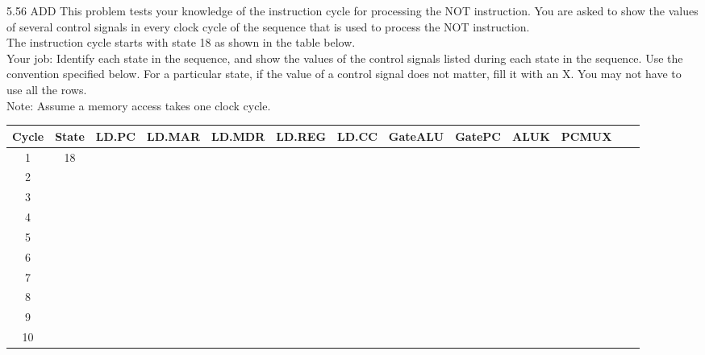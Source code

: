 \documentclass{patt}
\begin{document}
\begin{exercises}
\item[5.56]ADD This problem tests your knowledge of the instruction cycle for processing
the NOT instruction.  You are asked to show the values of several control
signals in every clock cycle of the sequence that is used to process the
NOT instruction.\\

\noindent
The instruction cycle starts with state 18 as shown in the table below.\\

\noindent
Your job: Identify each state in the sequence, and show the values of
the control signals listed during each state in the sequence. Use the
convention specified below. For a particular state, if the value of a
control signal does not matter, fill it with an X. You may not have to
use all the rows. \\



\noindent
Note: Assume a memory access takes one clock cycle. \\

\begin{table}[h]
\centering
\begin{tabular}{|c|c|c|c|c|c|c|c|c|c|c|c|c|}
\hline
Cycle & State & LD.PC & LD.MAR & LD.MDR & LD.REG & LD.CC & GateALU &
GatePC & ALUK & PCMUX\\[0.1in] \hline
 1    & 18           &       &        &         &        &       &&&&
\\[0.1in] \hline
 2    &              &       &        &         &        &       &&&&
\\[0.1in] \hline
 3    &              &       &        &         &        &       &&&&
\\[0.1in] \hline
 4    &              &       &        &         &        &       &&&&
\\[0.1in] \hline
 5    &              &       &        &         &        &       &&&&
\\[0.1in] \hline
 6    &              &       &        &         &        &       &&&&
\\[0.1in] \hline
 7    &              &       &        &         &        &       &&&&
\\[0.1in] \hline
 8    &              &       &        &         &        &       &&&&
\\[0.1in] \hline
 9    &              &       &        &         &        &       &&&&
\\[0.1in] \hline
10    &              &       &        &         &        &       &&&&
\\[0.1in] \hline
\end{tabular}
\end{table}


\end{exercises}
\end{document}
